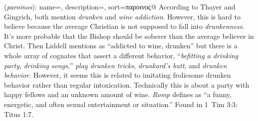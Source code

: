 \item[Wine romp,]

(\textit{paroinos}):
{
    name=,
    description={},
    sort=παροινος@
}
According to Thayer and Gingrich, both mention \emph{drunken} and \emph{wine addiction}. However, this is hard to believe because the average Christian is not supposed to fall into \emph{drunkenness}. It's more probable that the Bishop should be soberer than the average believer in Christ. Then Liddell mentions  as ``addicted to wine, drunken'' but there is a whole array of cognates that assert a different behavior,  ``\emph{befitting a drinking party}, \emph{drinking songs},''  \emph{play drunken tricks},  \emph{drunkard's butt}, and  \emph{drunken behavior}. However, it seems this is related to imitating frolicsome drunken behavior rather than regular intoxication. Technically this is about a party with happy fellows and an unknown amount of wine. \emph{Romp} defines as ``a funny, energetic, and often sexual entertainment or situation.''
Found in 1~Tim 3:3; Titus 1:7.
